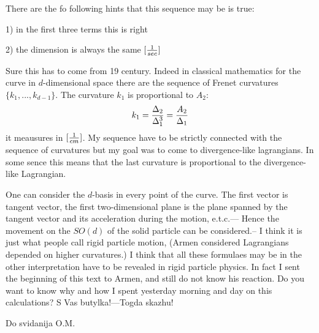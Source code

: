 There are the fo following hints that
    this sequence may be is true:

  1) in the first three terms this is right

  2) the dimension is always the same $[{1\over sec}]$

 Sure this has to come from 19 century. Indeed in classical mathematics
 for the curve in $d$-dimensional space there are the sequence of Frenet
  curvatures $\{k_1,...,k_{d-1}\}$. The curvature $k_1$ is proportional
 to $A_2$:
               $$
    k_1={\Delta_2\over\Delta_1^3}={A_2\over\Delta_1}
                $$
  it meausures in $[{1\over cm}]$.
My sequence have to be strictly connected with the sequence
 of curvatures but my goal was to come to divergence-like
 lagrangians. In some sence this means that the last
curvature is proportional to the divergence-like Lagrangian.

  One can consider the $d$-basis in every point of the curve.
The first vector is tangent vector, the first two-dimensional plane
is the plane spanned by the tangent vector and its acceleration
during the motion, e.t.c.--- Hence the movement on the
  $SO(d)$ of the solid particle can be considered.-- I think
it is just what people call rigid particle motion,
 (Armen considered Lagrangians depended on higher curvatures.)
  I think that all these formulaes may be in the other
 interpretation have to be revealed in rigid particle physics.
   In fact I sent the beginning of this text to Armen,
  and still do not know his reaction.
  Do you want to know why and how I spent yesterday
 morning and day on this calculations?
          S Vas butylka!---Togda skazhu!

            Do svidanija O.M.
\bye
